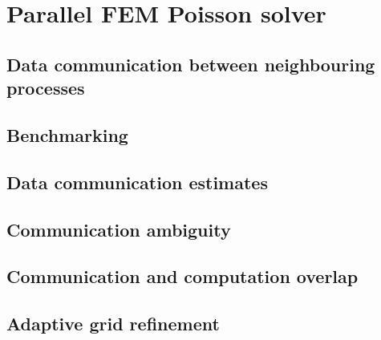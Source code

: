 \section{Parallel FEM Poisson solver}

\subsection{Data communication between neighbouring processes}

\subsection{Benchmarking}

\subsection{Data communication estimates}

\subsection{Communication ambiguity}

\subsection{Communication and computation overlap}

\subsection{Adaptive grid refinement}